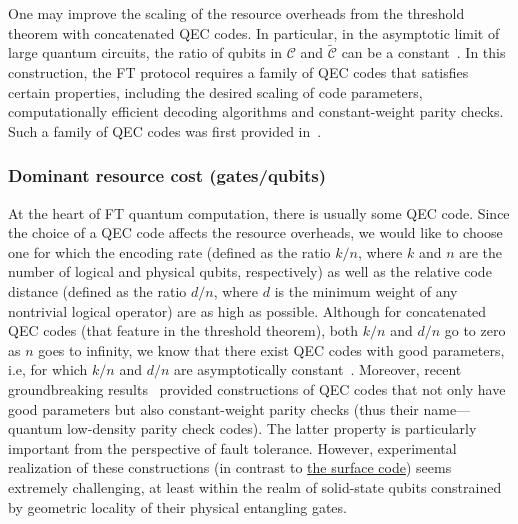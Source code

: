\begin{refsection}
One may improve the scaling of the resource overheads from the threshold theorem with concatenated QEC codes.
In particular, in the asymptotic limit of large quantum circuits, the ratio of qubits in $\mathcal C$ and $\widetilde{\mathcal C}$ can be a constant~\cite{gottesman2014FTQCconstantOverhead}.
In this construction, the FT protocol requires a family of QEC codes that satisfies certain properties, including the desired scaling of code parameters, computationally efficient decoding algorithms and constant-weight parity checks.
Such a family of QEC codes was first provided in~\cite{fawzi2018ConstantOverheadExpanderCode}.


\subsubsection*{Dominant resource cost (gates/qubits)}

At the heart of FT quantum computation, there is usually some QEC code.
Since the choice of a QEC code affects the resource overheads, we would like to choose one for which the encoding rate (defined as the ratio $k/n$, where $k$ and $n$ are the number of logical and physical qubits, respectively) as well as the relative code distance (defined as the ratio $d/n$, where $d$ is the minimum weight of any nontrivial logical operator) are as high as possible.
Although for concatenated QEC codes (that feature in the threshold theorem), both $k/n$ and $d/n$ go to zero as $n$ goes to infinity, we know that there exist QEC codes with good parameters, i.e, for which $k/n$ and $d/n$ are asymptotically constant~\cite{calderbank1996GoodQECCodes}.
Moreover, recent groundbreaking results~\cite{breuckmann2021balancedProductQuantumCodes,panteleev2022GoodLDPC,dinur2022LocallyTestable,leverrier2022QuantumTannerCodes} provided constructions of QEC codes that not only have good parameters but also constant-weight parity checks (thus their name---quantum low-density parity check codes).
The latter property is particularly important from the perspective of fault tolerance.
However, experimental realization of these constructions (in contrast to \hyperref[prim:QEC]{the surface code}) seems extremely challenging, at least within the realm of solid-state qubits constrained by geometric locality of their physical entangling gates. 



\end{refsection}
